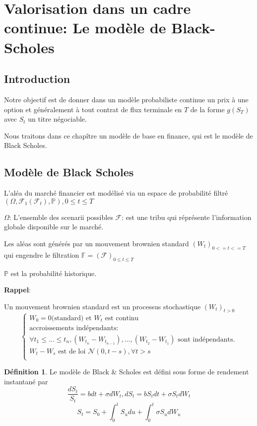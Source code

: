 \documentclass{article}
\theoremstyle{plain}
\theoremstyle{definition}
\newtheorem{defn}[thm]{D\'efinition}
\begin{document}
\section{Valorisation dans un cadre continue: Le mod\`ele de Black-Scholes}
\subsection{Introduction}
Notre objectif est de donner dans un mod\`ele probabiliste continue un prix \`a une option et g\'en\'eralement \`a tout contrat de flux terminale en $T$ de la forme $g(S_T)$ avec $S_t$ un titre n\'egociable.

Nous traitons dans ce chap\^itre un mod\`ele de base en finance, qui est le mod\`ele de Black Scholes.

\subsection{Mod\`ele de Black Scholes}
L'al\'ea du march\'e financier est mod\'elis\'e via un espace de probabilit\'e filtr\'e $(\Omega,\mathcal{F}_1(\mathcal{F}_t),\mathbb{P}),0\leq t\leq T$

$\Omega$: L'ensemble des scenarii possibles
$\mathcal{F}$: est une tribu qui r\'epr\'esente l'information globale disponible sur le march\'e.

Les al\'eas sont g\'en\'er\'es par un mouvement brownien standard $(W_t)_{0<=t<=T}$ qui engendre le filtration $\mathbb{F}=(\mathcal{F})_{0\leq t\leq T}$

$\mathbb{P}$ est la probabilit\'e historique.

\textbf{Rappel}:

Un mouvement brownien standard est un processus stochastique $(W_t)_{t>0}$
\begin{equation}
\left\{\begin{array}{l}
W_0=0 \text{(standard) et } W_t \text{ est continu}\\
\text{accroissements ind\'ependants}:\\
\forall t_1\leq\ldots \leq t_n, (W_{t_n}-W_{t_{n-1}}),\ldots,(W_{t_2}-W_{t_1}) \text{ sont ind\'ependants.}\\
W_t-W_s \text{ est de loi } \mathcal{N}(0,t-s),\forall t>s\\
\end{array}\right.
\end{equation}

\begin{defn}
	Le mod\`ele de Black \& Scholes est d\'efini sous forme de rendement instantan\'e par
\begin{equation}
\frac{d S_t}{S_t}=b dt+\sigma d W_t, d S_t=b S_t dt+\sigma S_t d W_t
\end{equation}
\begin{equation}
S_t=S_0+\int_0^t S_u du +\int_0^t \sigma S_u dW_u
\end{equation}
\end{defn}
\end{document}
